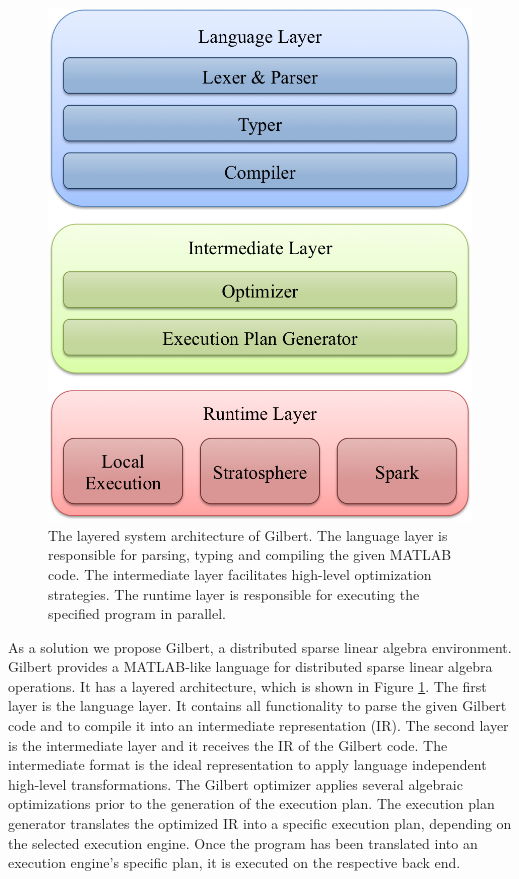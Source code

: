 \begin{figure}[t!]
\centering
\includegraphics[height=0.175\paperheight]{images/systemArchitecture.png}
\caption{The layered system architecture of Gilbert. The language layer is responsible for parsing, typing and compiling the given MATLAB code. The intermediate layer facilitates high-level optimization strategies. The runtime layer is responsible for executing the specified program in parallel.}
\label{fig:systemArchitecture}
\end{figure}

As a solution we propose Gilbert, a distributed sparse linear algebra environment. Gilbert provides a MATLAB-like language for distributed sparse linear algebra operations. It has a layered architecture, which is shown in Figure \ref{fig:systemArchitecture}. The first layer is the language layer. It contains all functionality to parse the given Gilbert code and to compile it into an intermediate representation (IR). The second layer is the intermediate layer and it receives the IR of the Gilbert code. The intermediate format is the ideal representation to apply language independent high-level transformations. The Gilbert optimizer applies several algebraic optimizations prior to the generation of the execution plan. The execution plan generator translates the optimized IR into a specific execution plan, depending on the selected execution engine. Once the program has been translated into an execution engine's specific plan, it is executed on the respective back end. 

